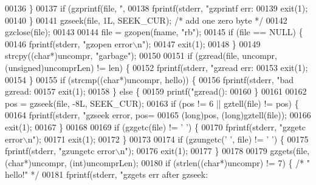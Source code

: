 \begin{DoxyCode}
{{{00136     \}
00137     \textcolor{keywordflow}{if} (gzprintf(file, \textcolor{stringliteral}{", %
00138         fprintf(stderr, \textcolor{stringliteral}{"gzprintf err: %
00139         exit(1);
00140     \}
00141     gzseek(file, 1L, SEEK\_CUR); \textcolor{comment}{/* add one zero byte */}
00142     gzclose(file);
00143 
00144     file = gzopen(fname, \textcolor{stringliteral}{"rb"});
00145     \textcolor{keywordflow}{if} (file == NULL) \{
00146         fprintf(stderr, \textcolor{stringliteral}{"gzopen error\(\backslash\)n"});
00147         exit(1);
00148     \}
00149     strcpy((\textcolor{keywordtype}{char}*)uncompr, \textcolor{stringliteral}{"garbage"});
00150 
00151     \textcolor{keywordflow}{if} (gzread(file, uncompr, (\textcolor{keywordtype}{unsigned})uncomprLen) != len) \{
00152         fprintf(stderr, \textcolor{stringliteral}{"gzread err: %
00153         exit(1);
00154     \}
00155     \textcolor{keywordflow}{if} (strcmp((\textcolor{keywordtype}{char}*)uncompr, hello)) \{
00156         fprintf(stderr, \textcolor{stringliteral}{"bad gzread: %
00157         exit(1);
00158     \} \textcolor{keywordflow}{else} \{
00159         printf(\textcolor{stringliteral}{"gzread(): %
00160     \}
00161 
00162     pos = gzseek(file, -8L, SEEK\_CUR);
00163     \textcolor{keywordflow}{if} (pos != 6 || gztell(file) != pos) \{
00164         fprintf(stderr, \textcolor{stringliteral}{"gzseek error, pos=%
00165                 (\textcolor{keywordtype}{long})pos, (\textcolor{keywordtype}{long})gztell(file));
00166         exit(1);
00167     \}
00168 
00169     \textcolor{keywordflow}{if} (gzgetc(file) != \textcolor{charliteral}{' '}) \{
00170         fprintf(stderr, \textcolor{stringliteral}{"gzgetc error\(\backslash\)n"});
00171         exit(1);
00172     \}
00173 
00174     \textcolor{keywordflow}{if} (gzungetc(\textcolor{charliteral}{' '}, file) != \textcolor{charliteral}{' '}) \{
00175         fprintf(stderr, \textcolor{stringliteral}{"gzungetc error\(\backslash\)n"});
00176         exit(1);
00177     \}
00178 
00179     gzgets(file, (\textcolor{keywordtype}{char}*)uncompr, (\textcolor{keywordtype}{int})uncomprLen);
00180     \textcolor{keywordflow}{if} (strlen((\textcolor{keywordtype}{char}*)uncompr) != 7) \{ \textcolor{comment}{/* " hello!" */}
00181         fprintf(stderr, \textcolor{stringliteral}{"gzgets err after gzseek: %
}}}}}}}}}}
\end{DoxyCode}
